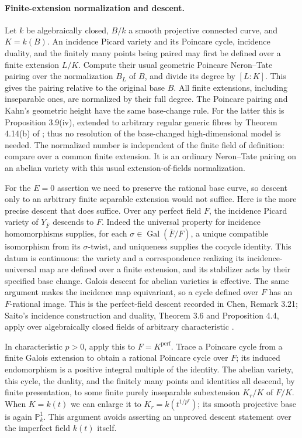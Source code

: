 \documentclass[11pt,a4paper]{article}
\theoremstyle{definition}
\theoremstyle{remark}
\begin{document}
\paragraph{Finite-extension normalization and descent.}
Let $k$ be algebraically closed, $B/k$ a smooth projective connected
curve, and $K=k(B)$.  An incidence Picard variety and its Poincare
cycle, incidence duality, and the finitely many points being paired
may first be defined over a finite extension $L/K$.  Compute their
usual geometric Poincare Neron--Tate pairing over the normalization
$B_L$ of $B$, and divide its degree by $[L:K]$.  This gives the
pairing relative to the original base $B$.  All finite extensions,
including inseparable ones, are normalized by their full degree.
The Poincare pairing and Kahn's geometric height have the same
base-change rule.  For the latter this is Proposition 3.9(iv),
extended to arbitrary regular generic fibres by Theorem 4.14(b)
of \cite{KahnHeight2024}; thus no resolution of the base-changed
high-dimensional model is needed.  The normalized number is
independent of the finite field of definition: compare over a
common finite extension.  It is an ordinary Neron--Tate pairing
on an abelian variety with this usual extension-of-fields
normalization.

For the $E=0$ assertion we need to preserve the rational base curve,
so descent only to an arbitrary finite separable extension would
not suffice.  Here is the more precise descent that does suffice.
Over any perfect field $F$, the incidence Picard variety of
$Y_{\overline F}$ descends to $F$.  Indeed the universal property
for incidence homomorphisms supplies, for each
$\sigma\in\operatorname{Gal}(\overline F/F)$, a unique compatible
isomorphism from its $\sigma$-twist, and uniqueness supplies the
cocycle identity.  This datum is continuous: the variety and a
correspondence realizing its incidence-universal map are defined
over a finite extension, and its stabilizer acts by their specified
base change.  Galois descent for abelian varieties is effective.
The same argument makes the incidence map equivariant, so a cycle
defined over $F$ has an $F$-rational image.  This is the
perfect-field descent recorded in Chen, Remark 3.21; Saito's
incidence construction and duality, Theorem 3.6 and Proposition 4.4,
apply over algebraically closed fields of arbitrary characteristic
\cite{SaitoPicard1979}.

In characteristic $p>0$, apply this to
$F=K^{\mathrm{perf}}$.  Trace a Poincare cycle from a finite Galois
extension to obtain a rational Poincare cycle over $F$; its induced
endomorphism is a positive integral multiple of the identity.
The abelian variety, this cycle, the duality, and the finitely many
points and identities all descend, by finite presentation, to some
finite purely inseparable subextension $K_r/K$ of $F/K$.
When $K=k(t)$ we can enlarge it to
$K_r=k(t^{1/p^r})$; its smooth projective base is again
$\mathbb P^1_k$.  This argument avoids asserting an unproved
descent statement over the imperfect field $k(t)$ itself.
\end{document}
